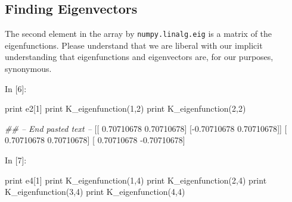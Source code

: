 \documentclass[12pt,]{book}
\newenvironment{Shaded}{}{}
\newcommand{\DecValTok}[1]{\textcolor[rgb]{0.25,0.63,0.44}{{#1}}}
\newcommand{\FloatTok}[1]{\textcolor[rgb]{0.25,0.63,0.44}{{#1}}}
\newcommand{\CommentTok}[1]{\textcolor[rgb]{0.38,0.63,0.69}{\textit{{#1}}}}
\newcommand{\OperatorTok}[1]{\textcolor[rgb]{0.40,0.40,0.40}{{#1}}}
\newcommand{\BuiltInTok}[1]{{#1}}
\newcommand{\NormalTok}[1]{{#1}}
\begin{document}
\vfill

\pagebreak

\subsection{Finding Eigenvectors}\label{finding-eigenvectors}

The second element in the array by \texttt{numpy.linalg.eig} is a matrix
of the eigenfunctions. Please understand that we are liberal with our
implicit understanding that eigenfunctions and eigenvectors are, for our
purposes, synonymous.

\begin{Shaded}
\begin{Highlighting}[]
\NormalTok{In [}\DecValTok{6}\NormalTok{]: }\OperatorTok{%
\BuiltInTok{print} \NormalTok{e2[}\DecValTok{1}\NormalTok{]}
\BuiltInTok{print} \NormalTok{K_eigenfunction(}\DecValTok{1}\NormalTok{,}\DecValTok{2}\NormalTok{)}
\BuiltInTok{print} \NormalTok{K_eigenfunction(}\DecValTok{2}\NormalTok{,}\DecValTok{2}\NormalTok{)}

\CommentTok{## -- End pasted text --}
\NormalTok{[[ }\FloatTok{0.70710678}  \FloatTok{0.70710678}\NormalTok{]}
 \NormalTok{[}\OperatorTok{-}\FloatTok{0.70710678}  \FloatTok{0.70710678}\NormalTok{]]}
\NormalTok{[ }\FloatTok{0.70710678}  \FloatTok{0.70710678}\NormalTok{]}
\NormalTok{[ }\FloatTok{0.70710678} \OperatorTok{-}\FloatTok{0.70710678}\NormalTok{]}

\NormalTok{In [}\DecValTok{7}\NormalTok{]: }\OperatorTok{%
\BuiltInTok{print} \NormalTok{e4[}\DecValTok{1}\NormalTok{]}
\BuiltInTok{print} \NormalTok{K_eigenfunction(}\DecValTok{1}\NormalTok{,}\DecValTok{4}\NormalTok{)}
\BuiltInTok{print} \NormalTok{K_eigenfunction(}\DecValTok{2}\NormalTok{,}\DecValTok{4}\NormalTok{)}
\BuiltInTok{print} \NormalTok{K_eigenfunction(}\DecValTok{3}\NormalTok{,}\DecValTok{4}\NormalTok{)}
\BuiltInTok{print} \NormalTok{K_eigenfunction(}\DecValTok{4}\NormalTok{,}\DecValTok{4}\NormalTok{)}

}}
\end{Highlighting}
\end{Shaded}
\end{document}
